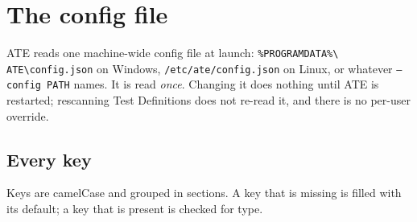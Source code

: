\chapter{The config file}\label{ch:config}

ATE reads one machine-wide config file at launch: \texttt{\%PROGRAMDATA\%\textbackslash
ATE\textbackslash config.json} on Windows, \texttt{/etc/ate/config.json} on Linux, or whatever
\texttt{--config PATH} names. It is read \emph{once}. Changing it does nothing until ATE is
restarted; rescanning Test Definitions does not re-read it, and there is no per-user override.

\section{Every key}

Keys are camelCase and grouped in sections. A key that is missing is filled with its default; a key
that is present is checked for type.

